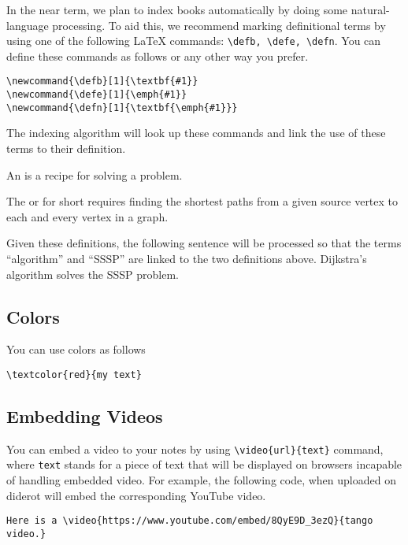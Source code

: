 \begin{flex}
In the near term, we plan to index books automatically by doing some natural-language processing.  
%
To aid this, we recommend marking definitional terms by using one of the following LaTeX commands: \lstinline`\defb, \defe, \defn`.  You can define these commands as follows or any other way you prefer.
%
\begin{lstlisting}
\newcommand{\defb}[1]{\textbf{#1}}
\newcommand{\defe}[1]{\emph{#1}}
\newcommand{\defn}[1]{\textbf{\emph{#1}}}
\end{lstlisting}
%
The indexing algorithm will look up these commands and link the use of these terms to their definition.

\begin{example}
\begin{definition}[Algorithm]
\label{def:algorithm}
An  is a recipe for solving a problem.
\end{definition}


\begin{definition}
\label{def:sssp}
The  or  for short requires finding  the shortest paths from a given source vertex to each and every vertex in a graph. 
\end{definition}

Given these definitions, the following sentence will be processed so that the terms ``algorithm'' and ``SSSP'' are linked to the two definitions above.
%
Dijkstra's algorithm solves the SSSP problem.
\end{example}
\end{flex}

\subsection{Colors}

You can use colors as follows
\begin{lstlisting}
\textcolor{red}{my text}
\end{lstlisting}


\subsection{Embedding Videos}

You can embed a video to your notes by using \lstinline`\video{url}{text}` command, where \lstinline`text` stands for a piece of text that will be displayed on browsers incapable of handling embedded video.
%
For example, the following code, when uploaded on diderot will embed the corresponding YouTube video.
%
\begin{lstlisting}
Here is a \video{https://www.youtube.com/embed/8QyE9D_3ezQ}{tango video.}
\end{lstlisting}

